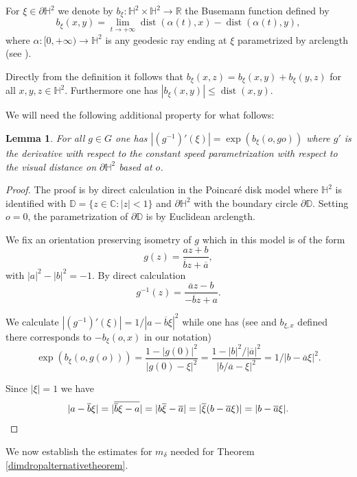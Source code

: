 \documentclass{article}
\newtheorem{lemma}{Lemma}
\DeclareMathOperator{\dist}{dist}
\newcommand{\R}{\mathbb{R}}
\renewcommand{\H}{\mathbb{H}}
\newcommand{\D}{\mathbb{D}}
\newcommand{\C}{\mathbb{C}}
\begin{document}
For \(\xi \in \partial \H^2\) we denote by \(b_\xi:\H^2 \times \H^2 \to \R\) the Busemann function defined by
\[b_\xi(x,y) = \lim\limits_{t \to +\infty}\dist(\alpha(t),x) - \dist(\alpha(t),y),\]
where \(\alpha:[0,+\infty) \to \H^2\) is any geodesic ray ending at \(\xi\) parametrized by arclength (see \cite[Theorem 1.18]{dalbo}).

Directly from the definition it follows that \(b_\xi(x,z) = b_\xi(x,y) + b_\xi(y,z)\) for all \(x,y,z \in \H^2\).  Furthermore one has \(|b_\xi(x,y)| \le \dist(x,y)\).

We will need the following additional property for what follows:
\begin{lemma}\label{horofunctionlemma}
For all \(g \in G\) one has \(|(g^{-1})'(\xi)| =\exp(b_\xi(o,g o))\) where \(g'\) is the derivative with respect to the constant speed parametrization with respect to the visual distance on \(\partial \H^2\) based at \(o\).
\end{lemma}
\begin{proof}
The proof is by direct calculation in the Poincaré disk model where \(\H^2\) is identified with \(\D = \lbrace z \in \C: |z| < 1\rbrace\) and \(\partial \H^2\) with the boundary circle \(\partial \D\).  Setting \(o = 0\), the parametrization of \(\partial \D\) is by Euclidean arclength.

We fix an orientation preserving isometry of \(g\) which in this model is of the form
\[g(z) = \frac{az + b}{\overline{b}z + \overline{a}},\]
with \(|a|^2 - |b|^2 = -1\).   By direct calculation
\[g^{-1}(z) = \frac{\overline{a}z - b}{-\overline{b}z + a}.\]


We calculate \(|(g^{-1})'(\xi)| = 1/|a -\overline{b}\xi|^2\) while one has (see \cite[pg. 273]{bridson-haefliger} and \(b_{\xi,x}\) defined there corresponds to \(-b_\xi(o,x)\) in our notation)
\[\exp(b_\xi(o,g(o))) = \frac{1 - |g(0)|^2}{|g(0)-\xi|^2} = \frac{1 - |b|^2/|\overline{a}|^2}{|b/\overline{a} - \xi|^2} = 1/|b -\overline{a}\xi|^2.\]

Since \(|\xi| = 1\) we have
\[|a-\overline{b}\xi| = |\overline{\overline{b}\xi-a}| = |b\overline{\xi}-\overline{a}| = |\overline{\xi}(b - \overline{a}\xi)| = |b-\overline{a}\xi|. \qedhere\]
\end{proof}

We now establish the estimates for \(m_\delta\) needed for Theorem \ref{dimdropalternativetheorem}.
\end{document}
